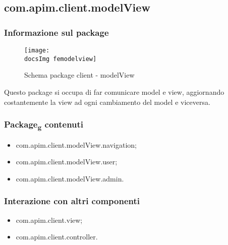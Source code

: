 {	\subsection{com.apim.client.modelView}{
		\subsubsection{Informazione sul package}{
			\begin{figure}[ht]
				\centering
				\texttt{[image: \\docsImg femodelview]}
				\caption{Schema package client - modelView}
			\end{figure}
			Questo package si occupa di far comunicare model e view, aggiornando costantemente la view ad ogni cambiamento del model e viceversa.
		}
		\subsubsection{Package\textsubscript{g} contenuti}{
			\begin{itemize}
				\item com.apim.client.modelView.navigation;
				\item com.apim.client.modelView.user;
				\item com.apim.client.modelView.admin.
			\end{itemize}
		}
		\subsubsection{Interazione con altri componenti}{
			\begin{itemize}
				\item com.apim.client.view;
				\item com.apim.client.controller.
			\end{itemize}
}}}
